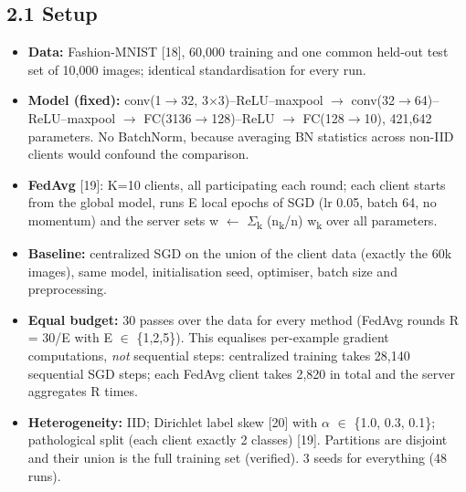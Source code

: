\documentclass[10pt,a4paper]{article}
\begin{document}
\subsection*{2.1 Setup}
\begin{itemize}
\item \textbf{Data:} Fashion-MNIST [18], 60,000 training and one common held-out test set of 10,000 images; identical standardisation for every run.
\item \textbf{Model (fixed):} conv(1$\rightarrow$32, 3$\times$3)--ReLU--maxpool $\rightarrow$ conv(32$\rightarrow$64)--ReLU--maxpool $\rightarrow$ FC(3136$\rightarrow$128)--ReLU $\rightarrow$ FC(128$\rightarrow$10), 421,642 parameters. No BatchNorm, because averaging BN statistics across non-IID clients would confound the comparison.
\item \textbf{FedAvg} [19]: K=10 clients, all participating each round; each client starts from the global model, runs E local epochs of SGD (lr 0.05, batch 64, no momentum) and the server sets w $\leftarrow$ $\Sigma$\textsubscript{k} (n\textsubscript{k}/\allowbreak{}n) w\textsubscript{k} over all parameters.
\item \textbf{Baseline:} centralized SGD on the union of the client data (exactly the 60k images), same model, initialisation seed, optimiser, batch size and preprocessing.
\item \textbf{Equal budget:} 30 passes over the data for every method (FedAvg rounds R = 30/\allowbreak{}E with E $\in$ \{1,2,5\}). This equalises per-example gradient computations, \textit{not} sequential steps: centralized training takes 28,140 sequential SGD steps; each FedAvg client takes 2,820 in total and the server aggregates R times.
\item \textbf{Heterogeneity:} IID; Dirichlet label skew [20] with $\alpha$ $\in$ \{1.0, 0.3, 0.1\}; pathological split (each client exactly 2 classes) [19]. Partitions are disjoint and their union is the full training set (verified). 3 seeds for everything (48 runs).
\end{itemize}
\end{document}

